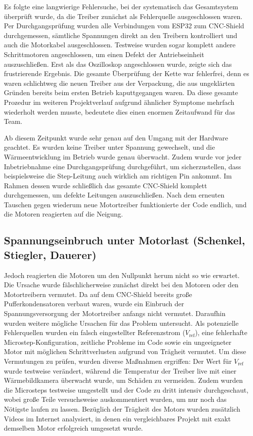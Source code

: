 \documentclass[fontsize=12pt,
parskip=half,	%
department=FakM,  %
logostyle=flat,
twoside, %
DIV=15,BCOR=10mm, %
]{OTHRreprt}
\begin{document}
Es folgte eine langwierige Fehlersuche, bei der systematisch das Gesamtsystem überprüft wurde, da die Treiber zunächst als Fehlerquelle ausgeschlossen waren.
Per Durchgangsprüfung wurden alle Verbindungen vom ESP32 zum CNC-Shield durchgemessen, sämtliche Spannungen direkt an den Treibern kontrolliert und auch die Motorkabel ausgeschlossen. 
Testweise wurden sogar komplett andere Schrittmotoren angeschlossen, um einen Defekt der Antriebseinheit auszuschließen. Erst als das Oszilloskop angeschlossen wurde, zeigte sich das frustrierende Ergebnis.
Die gesamte Überprüfung der Kette war fehlerfrei, denn es waren schlichtweg die neuen Treiber aus der Verpackung, die aus ungeklärten Gründen bereits beim ersten Betrieb kaputtgegangen waren. 
Da diese gesamte Prozedur im weiteren Projektverlauf aufgrund ähnlicher Symptome mehrfach wiederholt werden musste, bedeutete dies einen enormen Zeitaufwand für das Team.

Ab diesem Zeitpunkt wurde sehr genau auf den Umgang mit der Hardware geachtet. Es wurden keine Treiber unter Spannung gewechselt, und die Wärmeentwicklung im Betrieb wurde genau überwacht. 
Zudem wurde vor jeder Inbetriebnahme eine Durchgangsprüfung durchgeführt, um sicherzustellen, dass beispielsweise die Step-Leitung auch wirklich am richtigen Pin ankommt. 
Im Rahmen dessen wurde schließlich das gesamte CNC-Shield komplett durchgemessen, um defekte Leitungen auszuschließen. 
Nach dem erneuten Tauschen gegen wiederum neue Motortreiber funktionierte der Code endlich, und die Motoren reagierten auf die Neigung.

\subsection{Spannungseinbruch unter Motorlast (Schenkel, Stiegler, Dauerer)}
\label{subsec:spannungseinbruch}
Jedoch reagierten die Motoren um den Nullpunkt herum nicht so wie erwartet. Die Ursache wurde fälschlicherweise zunächst direkt bei den Motoren oder den Motortreibern vermutet. 
Da auf dem CNC-Shield bereits große Pufferkondensatoren verbaut waren, wurde ein Einbruch der Spannungsversorgung der Motortreiber anfangs nicht vermutet. Daraufhin wurden weitere mögliche Ursachen für das Problem untersucht.
Als potenzielle Fehlerquellen wurden ein falsch eingestellter Referenzstrom ($V_{\text{ref}}$), eine fehlerhafte Microstep-Konfiguration, zeitliche Probleme im Code sowie ein ungeeigneter Motor mit möglichen Schrittverlusten aufgrund von Trägheit vermutet. 
Um diese Vermutungen zu prüfen, wurden diverse Maßnahmen ergriffen: Der Wert für $V_{\text{ref}}$ wurde testweise verändert, während die Temperatur der Treiber live mit einer Wärmebildkamera überwacht wurde, um Schäden zu vermeiden. 
Zudem wurden die Microsteps testweise umgestellt und der Code zu dritt intensiv durchgeschaut, wobei große Teile versuchsweise auskommentiert wurden, um nur noch das Nötigste laufen zu lassen.
Bezüglich der Trägheit des Motors wurden zusätzlich Videos im Internet analysiert, in denen ein vergleichbares Projekt mit exakt demselben Motor erfolgreich umgesetzt wurde.
\end{document}
